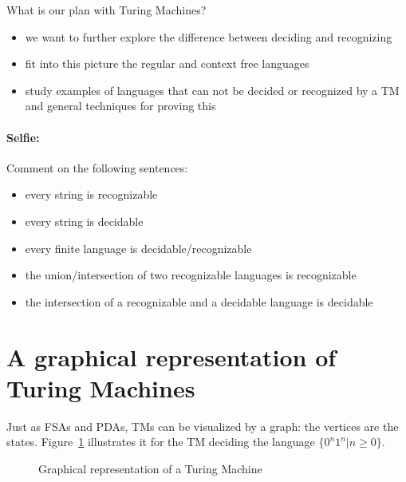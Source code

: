 What is our plan with Turing Machines?

\begin{itemize}
\item we want to further explore the difference between deciding and
  recognizing
\item fit into this picture the regular and context free
  languages
\item study examples of languages that can not be decided or
  recognized by a TM and general techniques for proving this
\end{itemize}



\paragraph{Selfie:} Comment on the following sentences:

\begin{itemize}
\item every string is recognizable
\item every string is decidable
\item every finite language is decidable/recognizable
\item the union/intersection of two recognizable languages is recognizable
\item the intersection of a recognizable and a decidable language is
  decidable
\end{itemize}




\section{A graphical representation of Turing Machines}

Just as FSAs and PDAs, TMs can be visualized by a graph: the vertices
are the states. Figure~\ref{turing2} illustrates it for the TM
deciding the language $\{0^n1^n|n \geq 0\}$.




\begin{figure}[h]
\caption{Graphical representation of a Turing Machine\label{turing2}}
\end{figure}

